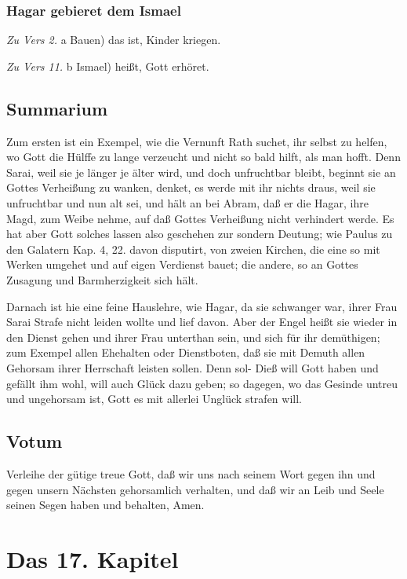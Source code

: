 \subsection{Hagar gebieret dem Ismael}

\emph{Zu Vers 2.} a Bauen) das ist, Kinder kriegen.

\emph{Zu Vers 11.} b Ismael) heißt, Gott erhöret.

\section{Summarium}

Zum ersten ist ein Exempel, wie die Vernunft Rath suchet, ihr selbst zu helfen, wo Gott die Hülffe zu lange verzeucht und nicht so bald hilft, als man hofft. Denn Sarai, weil sie je länger je älter wird, und doch unfruchtbar bleibt, beginnt sie an Gottes Verheißung zu wanken, denket, es werde mit ihr nichts draus, weil sie unfruchtbar und nun alt sei, und hält an bei Abram, daß er die Hagar, ihre Magd, zum Weibe nehme, auf daß Gottes Verheißung nicht verhindert werde. Es hat aber Gott solches lassen also geschehen zur sondern Deutung; wie Paulus zu den Galatern Kap. 4, 22. davon disputirt, von zweien Kirchen, die eine so mit Werken umgehet und auf eigen Verdienst bauet; die andere, so an Gottes Zusagung und Barmherzigkeit sich hält.

Darnach ist hie eine feine Hauslehre, wie Hagar, da sie schwanger war, ihrer Frau Sarai Strafe nicht leiden wollte und lief davon. Aber der Engel heißt sie wieder in den Dienst gehen und ihrer Frau unterthan sein, und sich für ihr demüthigen; zum Exempel allen Ehehalten oder Dienstboten, daß sie mit Demuth allen Gehorsam ihrer Herrschaft leisten sollen. Denn sol-
Dieß will Gott haben und gefällt ihm wohl, will auch Glück dazu geben; so dagegen, wo das Gesinde untreu und ungehorsam ist, Gott es mit allerlei Unglück strafen will.

\section{Votum}

Verleihe der gütige treue Gott, daß wir uns nach seinem Wort gegen ihn und gegen unsern Nächsten gehorsamlich verhalten, und daß wir an Leib und Seele seinen Segen haben und behalten, Amen.

\chapter{Das 17. Kapitel}

